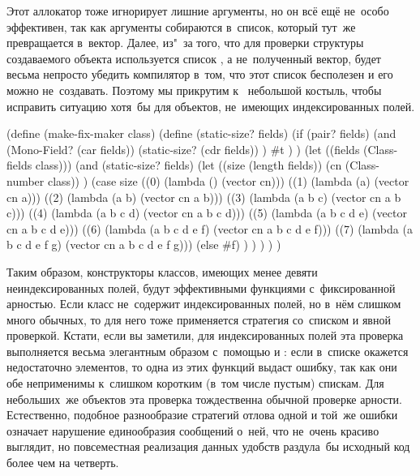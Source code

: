 Этот аллокатор тоже игнорирует лишние аргументы, но он всё ещё не~особо
эффективен, так как аргументы собираются в~список, который тут~же превращается
в~вектор. Далее, из"~за того, что для проверки структуры создаваемого объекта
используется список , а не~полученный вектор, будет весьма непросто
убедить компилятор в~том, что этот список бесполезен и его можно не~создавать.
Поэтому мы прикрутим к~ небольшой костыль, чтобы исправить
ситуацию хотя~бы для объектов, не~имеющих индексированных полей.


\begin{code:lisp}[label=objects/accomp/maker/src:fix-maker]
(define (make-fix-maker class)
  (define (static-size? fields)
    (if (pair? fields)
        (and (Mono-Field? (car fields))
             (static-size? (cdr fields)) )
        #t ) )
  (let ((fields (Class-fields class)))
    (and (static-size? fields)
         (let ((size (length fields))
               (cn (Class-number class)) )
           (case size
             ((0)  (lambda ()              (vector cn)))
             ((1)  (lambda (a)             (vector cn a)))
             ((2)  (lambda (a b)           (vector cn a b)))
             ((3)  (lambda (a b c)         (vector cn a b c)))
             ((4)  (lambda (a b c d)       (vector cn a b c d)))
             ((5)  (lambda (a b c d e)     (vector cn a b c d e)))
             ((6)  (lambda (a b c d e f)   (vector cn a b c d e f)))
             ((7)  (lambda (a b c d e f g) (vector cn a b c d e f g)))
             (else #f) ) ) ) ) )
\end{code:lisp}


Таким образом, конструкторы классов, имеющих менее девяти неиндексированных
полей, будут эффективными функциями с~фиксированной арностью. Если класс
не~содержит индексированных полей, но в~нём слишком много обычных, то для него
тоже применяется стратегия со~списком и явной проверкой. Кстати, если вы
заметили, для индексированных полей эта проверка выполняется весьма элегантным
образом с~помощью  и : если в~списке окажется недостаточно
элементов, то одна из этих функций выдаст ошибку, так как они обе неприменимы
к~слишком коротким (в~том числе пустым) спискам. Для небольших~же объектов эта
проверка тождественна обычной проверке арности. Естественно, подобное
разнообразие стратегий отлова одной и той~же ошибки означает нарушение
единообразия сообщений о~ней, что не~очень красиво выглядит, но повсеместная
реализация данных удобств раздула~бы исходный код {\Meroonet} более чем на
четверть.

